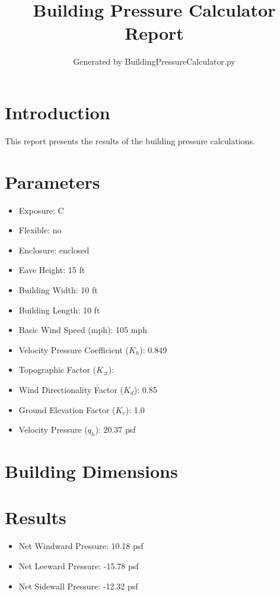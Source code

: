 \documentclass{article}
\title{Building Pressure Calculator Report}
\author{Generated by BuildingPressureCalculator.py}
\begin{document}
\maketitle

\section{Introduction}
This report presents the results of the building pressure calculations.

\section{Parameters}
\begin{itemize}
    \item Exposure: C
    \item Flexible: no
    \item Enclosure: enclosed
    \item Eave Height: 15 ft
    \item Building Width: 10 ft
    \item Building Length: 10 ft
    \item Basic Wind Speed (mph): 105 mph
    \item Velocity Pressure Coefficient ($K_h$): 0.849
    \item Topographic Factor ($K_{zt}$): 
    \item Wind Directionality Factor ($K_d$): 0.85
    \item Ground Elevation Factor ($K_e$): 1.0
    \item Velocity Pressure ($q_h$): 20.37 psf
\end{itemize}

\section{Building Dimensions}

\section{Results}
\begin{itemize}
    \item Net Windward Pressure: 10.18 psf
    \item Net Leeward Pressure: -15.78 psf
    \item Net Sidewall Pressure: -12.32 psf
\end{itemize}
\end{document}
